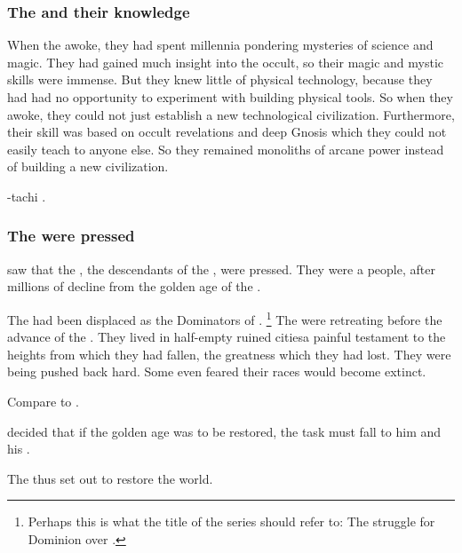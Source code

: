 \subsubsection{The \dragons and their knowledge}
When the \dragons awoke, they had spent millennia pondering mysteries of science and magic. 
They had gained much insight into the occult, so their magic and mystic skills were immense. 
But they knew little of physical technology, because they had had no opportunity to experiment with building physical tools. 
So when they awoke, they could not just establish a new technological civilization. 
Furthermore, their skill was based on occult revelations and deep Gnosis which they could not easily teach to anyone else. 
So they remained monoliths of arcane power instead of building a new civilization. 

\Nexagglachel-tachi . 





\subsubsection{The \ophidians were pressed}
\Nexagglachel saw that the \quiljaaran, the descendants of the \ophidians, were pressed. 
They were a  people, after millions of decline from the golden age of the . 

The \ophidians had been displaced as the Dominators of \Miith{}.%
\footnote{%
  Perhaps this is what the title of the series should refer to: 
  The struggle for Dominion over \Miith{}.%
} 
The \quiljaaran were retreating before the advance of the \aryothim.
They lived in half-empty ruined cities\dash a painful testament to the heights from which they had fallen, the greatness which they had lost. 
They were being pushed back hard. 
Some even feared their races would become extinct. 

Compare to . 

\Nexagglachel decided that if the \ophidian golden age was to be restored, the task must fall to him and his \dragons. 

The \dragons thus set out to restore the world. 









